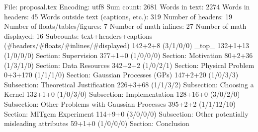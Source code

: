 File: proposal.tex
Encoding: utf8
Sum count: 2681
Words in text: 2274
Words in headers: 45
Words outside text (captions, etc.): 319
Number of headers: 19
Number of floats/tables/figures: 7
Number of math inlines: 27
Number of math displayed: 16
Subcounts:
  text+headers+captions (#headers/#floats/#inlines/#displayed)
  142+2+8 (3/1/0/0) _top_
  132+1+13 (1/0/0/0) Section: Supervision
  377+1+0 (1/0/0/0) Section: Motivation
  80+2+36 (1/3/1/0) Section: Data Resources
  342+2+2 (1/0/2/1) Section: Physical Problem
  0+3+170 (1/1/1/0) Section: Gaussian Processes (GPs)
  147+2+20 (1/0/3/3) Subsection: Theoretical Justification
  226+3+68 (1/1/3/2) Subsection: Choosing a Kernel
  132+1+0 (1/0/3/0) Subsection: Implementation
  128+16+0 (3/0/2/0) Subsection: Other Problems with Gaussian Processes
  395+2+2 (1/1/12/10) Section: MITgcm Experiment
  114+9+0 (3/0/0/0) Subsection: Other potentially misleading attributes
  59+1+0 (1/0/0/0) Section: Conclusion

